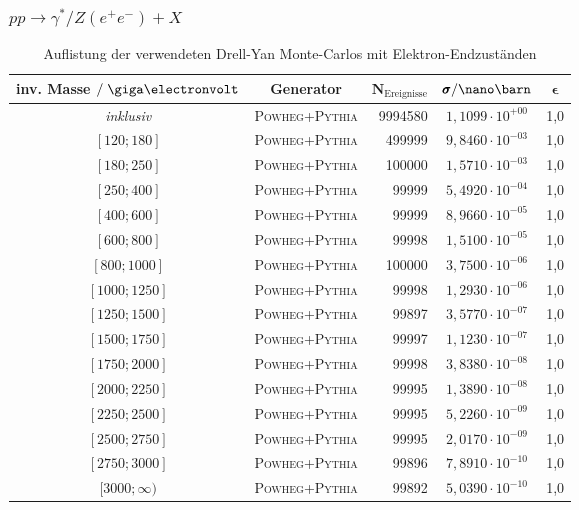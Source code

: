 \subsubsection*{$pp \rightarrow \gamma^*/Z(e^+e^-) + X$}
\begin{table}[h]
    \small
    \centering
    \begin{tabular}{|c|c|r|c|c|}
        \hline
        \bf{inv. Masse} $/\GeV$ & \bf{Generator} & $\pmb N_\text{Ereignisse}$ &
        $\pmb\sigma / \nano\barn$ & $\pmb\epsilon$ \\
        \hline \hline
        \textit{inklusiv} & \textsc{Powheg+Pythia} & 9994580 & $1,1099\cdot 10^{+00}$ & 1,0 \\
        $[120 ; 180]$     & \textsc{Powheg+Pythia} & 499999  & $9,8460\cdot 10^{-03}$ & 1,0 \\
        $[180 ; 250]$     & \textsc{Powheg+Pythia} & 100000  & $1,5710\cdot 10^{-03}$ & 1,0 \\
        $[250 ; 400]$     & \textsc{Powheg+Pythia} & 99999   & $5,4920\cdot 10^{-04}$ & 1,0 \\
        $[400 ; 600]$     & \textsc{Powheg+Pythia} & 99999   & $8,9660\cdot 10^{-05}$ & 1,0 \\
        $[600 ; 800]$     & \textsc{Powheg+Pythia} & 99998   & $1,5100\cdot 10^{-05}$ & 1,0 \\
        $[800 ; 1000]$    & \textsc{Powheg+Pythia} & 100000  & $3,7500\cdot 10^{-06}$ & 1,0 \\
        $[1000 ; 1250]$   & \textsc{Powheg+Pythia} & 99998   & $1,2930\cdot 10^{-06}$ & 1,0 \\
        $[1250 ; 1500]$   & \textsc{Powheg+Pythia} & 99897   & $3,5770\cdot 10^{-07}$ & 1,0 \\
        $[1500 ; 1750]$   & \textsc{Powheg+Pythia} & 99997   & $1,1230\cdot 10^{-07}$ & 1,0 \\
        $[1750 ; 2000]$   & \textsc{Powheg+Pythia} & 99998   & $3,8380\cdot 10^{-08}$ & 1,0 \\
        $[2000 ; 2250]$   & \textsc{Powheg+Pythia} & 99995   & $1,3890\cdot 10^{-08}$ & 1,0 \\
        $[2250 ; 2500]$   & \textsc{Powheg+Pythia} & 99995   & $5,2260\cdot 10^{-09}$ & 1,0 \\
        $[2500 ; 2750]$   & \textsc{Powheg+Pythia} & 99995   & $2,0170\cdot 10^{-09}$ & 1,0 \\
        $[2750 ; 3000]$   & \textsc{Powheg+Pythia} & 99896   & $7,8910\cdot 10^{-10}$ & 1,0 \\
        $[3000 ; \infty)$ & \textsc{Powheg+Pythia} & 99892   & $5,0390\cdot 10^{-10}$ & 1,0 \\
        \hline
    \end{tabular}
    \caption{Auflistung der verwendeten Drell-Yan Monte-Carlos mit Elektron-Endzuständen} 
\end{table}
\FloatBarrier

